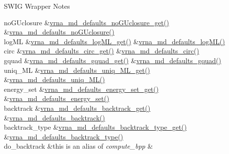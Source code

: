 \begin{DoxyRefDesc}{S\+W\+I\+G Wrapper Notes}
\begin{longtabu}
no\+G\+Uclosure &\hyperlink{group__model__details_ga4f7fdad083243a5348d63320ddaa70f3}{vrna\+\_\+md\+\_\+defaults\+\_\+no\+G\+Uclosure\+\_\+get()} &\hyperlink{group__model__details_gade5b9951d71ca2fb357a4e6c0c18ccd1}{vrna\+\_\+md\+\_\+defaults\+\_\+no\+G\+Uclosure()} \\
log\+ML &\hyperlink{group__model__details_ga93f04e070d529c5d0bb87c9681f6ad29}{vrna\+\_\+md\+\_\+defaults\+\_\+log\+M\+L\+\_\+get()} &\hyperlink{group__model__details_ga3de50a73455d88c3957386933b8e1f90}{vrna\+\_\+md\+\_\+defaults\+\_\+log\+M\+L()} \\
circ &\hyperlink{group__model__details_gad3a7e58de344ad93a08925f58f94f6fb}{vrna\+\_\+md\+\_\+defaults\+\_\+circ\+\_\+get()} &\hyperlink{group__model__details_ga4e1deb3e91a8a99e5c6dd905a5eb0186}{vrna\+\_\+md\+\_\+defaults\+\_\+circ()} \\
gquad &\hyperlink{group__model__details_gae645b8612f879eb38b45244fa9eddb9e}{vrna\+\_\+md\+\_\+defaults\+\_\+gquad\+\_\+get()} &\hyperlink{group__model__details_ga0685ca2aeb39af76f2421fc308163dce}{vrna\+\_\+md\+\_\+defaults\+\_\+gquad()} \\
uniq\+\_\+\+ML &\hyperlink{group__model__details_gab48e70fd024bf838404bcbcca0c874a0}{vrna\+\_\+md\+\_\+defaults\+\_\+uniq\+\_\+\+M\+L\+\_\+get()} &\hyperlink{group__model__details_ga59b944f61c5d2babec2d4c48c820de67}{vrna\+\_\+md\+\_\+defaults\+\_\+uniq\+\_\+\+M\+L()} \\
energy\+\_\+set &\hyperlink{group__model__details_ga017ed6afb1cba2b7f242412cab618b53}{vrna\+\_\+md\+\_\+defaults\+\_\+energy\+\_\+set\+\_\+get()} &\hyperlink{group__model__details_ga8dd29c55787a4576277e1907e92d810c}{vrna\+\_\+md\+\_\+defaults\+\_\+energy\+\_\+set()} \\
backtrack &\hyperlink{group__model__details_ga90da1156e6883ddd68527c2830706648}{vrna\+\_\+md\+\_\+defaults\+\_\+backtrack\+\_\+get()} &\hyperlink{group__model__details_ga978c468b2fe96a70d5191e3dd17d5599}{vrna\+\_\+md\+\_\+defaults\+\_\+backtrack()} \\
backtrack\+\_\+type &\hyperlink{group__model__details_ga1425b4ebd0e034dead66d79becd64143}{vrna\+\_\+md\+\_\+defaults\+\_\+backtrack\+\_\+type\+\_\+get()} &\hyperlink{group__model__details_ga68305274de96b56b7799575e222560d8}{vrna\+\_\+md\+\_\+defaults\+\_\+backtrack\+\_\+type()} \\
do\+\_\+backtrack &this is an alias of {\itshape compute\+\_\+bpp} &\\

\end{longtabu}
\end{DoxyRefDesc}
